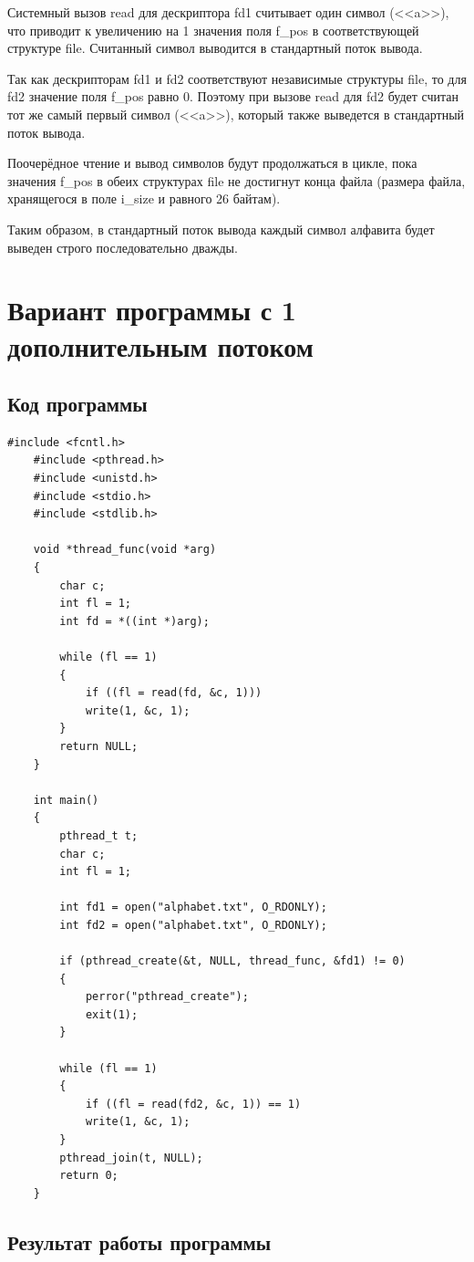 	Системный вызов read для дескриптора fd1 считывает один символ (<<a>>), что приводит к увеличению на 1 значения поля f\_pos в соответствующей структуре file. Считанный символ выводится в стандартный поток вывода.
	
	Так как дескрипторам fd1 и fd2 соответствуют независимые структуры file, то для fd2 значение поля f\_pos равно 0. Поэтому при вызове read для fd2 будет считан тот же самый первый символ (<<a>>), который также выведется в стандартный поток вывода.
	
	Поочерёдное чтение и вывод символов будут продолжаться в цикле, пока значения f\_pos в обеих структурах file не достигнут конца файла (размера файла, хранящегося в поле i\_size и равного 26 байтам).
	
	Таким образом, в стандартный поток вывода каждый символ алфавита будет выведен строго последовательно дважды.
	
	\section{Вариант программы с 1 дополнительным потоком}
	
	\subsection{Код программы}
	
	\begin{lstlisting}[caption={Код программы с 1 дополнительным потоком}, label={code:p2_2thread_join}]
	#include <fcntl.h>
	#include <pthread.h>
	#include <unistd.h>
	#include <stdio.h>
	#include <stdlib.h>
	
	void *thread_func(void *arg)
	{
		char c;
		int fl = 1;
		int fd = *((int *)arg);
		
		while (fl == 1)
		{
			if ((fl = read(fd, &c, 1)))
			write(1, &c, 1);
		}
		return NULL;
	}
	
	int main()
	{
		pthread_t t;
		char c;
		int fl = 1;
		
		int fd1 = open("alphabet.txt", O_RDONLY);
		int fd2 = open("alphabet.txt", O_RDONLY);
		
		if (pthread_create(&t, NULL, thread_func, &fd1) != 0)
		{
			perror("pthread_create");
			exit(1);
		}
		
		while (fl == 1)
		{
			if ((fl = read(fd2, &c, 1)) == 1)
			write(1, &c, 1);
		}
		pthread_join(t, NULL);
		return 0;
	}
	\end{lstlisting}
	
	\subsection{Результат работы программы}
	
